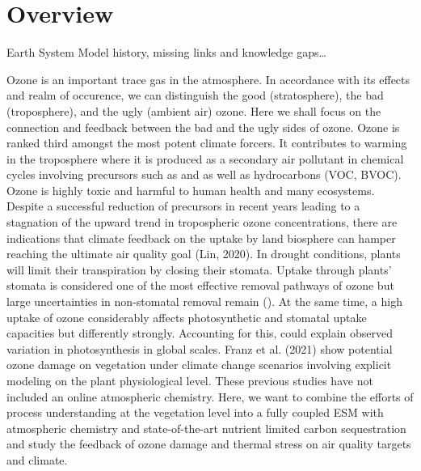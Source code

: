 \documentclass[11pt, letter, oneside, article]{memoir}
\begin{document}
  \chapter{Overview}
  Earth System Model history, missing links and knowledge gaps…

Ozone is an important trace gas in the atmosphere. In accordance with its effects and realm of occurence, we can distinguish the good (stratosphere), the bad (troposphere), and the ugly (ambient air) ozone. Here we shall focus on the connection and feedback between the bad and the ugly sides of ozone. Ozone is ranked third amongst the most potent climate forcers. It contributes to warming in the troposphere where it is produced as a secondary air pollutant in chemical cycles involving precursors such as  and  as well as hydrocarbons (VOC, BVOC). Ozone is highly toxic and harmful to human health and many ecosystems. Despite a successful reduction of precursors in recent years leading to a stagnation of the upward trend in tropospheric ozone concentrations, there are indications that climate feedback on the uptake by land biosphere can hamper reaching the ultimate air quality goal (Lin, 2020). In drought conditions, plants will limit their transpiration by closing their stomata. Uptake through plants’ stomata is considered one of the most effective removal pathways of ozone but large uncertainties in non-stomatal removal remain (\parencite{RG:Clifton2020}). At the same time, a high uptake of ozone considerably affects photosynthetic and stomatal uptake capacities but differently strongly. Accounting for this, \cite{BGS:Lombardozzi2013} could explain observed variation in photosynthesis in global scales. Franz et al. (2021) show potential ozone damage on vegetation under climate change scenarios involving explicit modeling on the plant physiological level. These previous studies have not included an online atmospheric chemistry. Here, we want to combine the efforts of process understanding at the vegetation level into a fully coupled ESM with atmospheric chemistry and state-of-the-art nutrient limited carbon sequestration and study the feedback of ozone damage and thermal stress on air quality targets and climate.

%
\printbibliography[env=bibliography]
\end{document}
